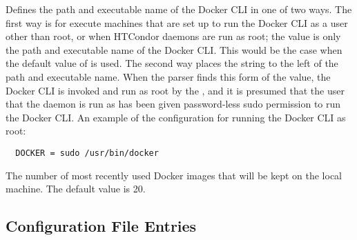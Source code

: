 \begin{description}
\label{param:Docker}
\item[\Macro{DOCKER}]
  Defines
  the path and executable name of the Docker CLI in one of two ways.
  The first way is for execute machines
  that are set up to run the Docker CLI as a user other than root,
  or when HTCondor daemons are run as root;
  the value is only the path and executable name of the Docker CLI.
  This would be the case when the default value of 
  is used.
  The second way places the string  to the left of the 
  path and executable name.
  When the parser finds this form of the value,
  the Docker CLI is invoked and run as root by the ,
  and it is presumed that the user that the  daemon is
  run as has been given password-less sudo permission to run the Docker CLI.
  An example of the configuration for running the Docker CLI as root:
\begin{verbatim}
  DOCKER = sudo /usr/bin/docker
\end{verbatim}

\label{param:DockerImageCacheSize}
\item[\Macro{DOCKER\_IMAGE\_CACHE\_SIZE}]
  The number of most recently used Docker images that will be kept on the
  local machine.
  The default value is 20.

\end{description}

\subsection{\label{sec:Schedd-Config-File-Entries}
Configuration File Entries}

